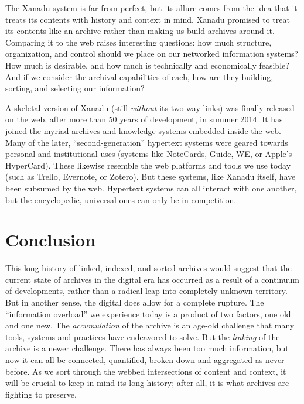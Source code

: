 The Xanadu system is far from perfect, but its allure comes from the idea that it treats its contents with history and context in mind. Xanadu promised to treat its contents like an archive rather than making us build archives around it. Comparing it to the web raises interesting questions: how much structure, organization, and control should we place on our networked information systems? How much is desirable, and how much is technically and economically feasible? And if we consider the archival capabilities of each, how are they building, sorting, and selecting our information?

A skeletal version of Xanadu (still \emph{without} its two-way links) was finally released on the web, after more than 50 years of development, in summer 2014.\autocite{_pioneering_????,hern_worlds_2014} It has joined the myriad archives and knowledge systems embedded inside the web. Many of the later, ``second-generation'' hypertext systems were geared towards personal and institutional uses (systems like NoteCards, Guide, WE, or Apple's HyperCard).\autocite{halasz_reflections_1988} These likewise resemble the web platforms and tools we use today (such as Trello, Evernote, or Zotero). But these systems, like Xanadu itself, have been subsumed by the web. Hypertext systems can all interact with one another, but the encyclopedic, universal ones can only be in competition.

\section{Conclusion}

This long history of linked, indexed, and sorted archives would suggest that the current state of archives in the digital era has occurred as a result of a continuum of developments, rather than a radical leap into completely unknown territory. But in another sense, the digital does allow for a complete rupture. The ``information overload'' we experience today is a product of two factors, one old and one new. The \emph{accumulation} of the archive is an age-old challenge that many tools, systems and practices have endeavored to solve. But the \emph{linking} of the archive is a newer challenge. There has always been too much information, but now it can all be connected, quantified, broken down and aggregated as never before. As we sort through the webbed intersections of content and context, it will be crucial to keep in mind its long history; after all, it is what archives are fighting to preserve.

